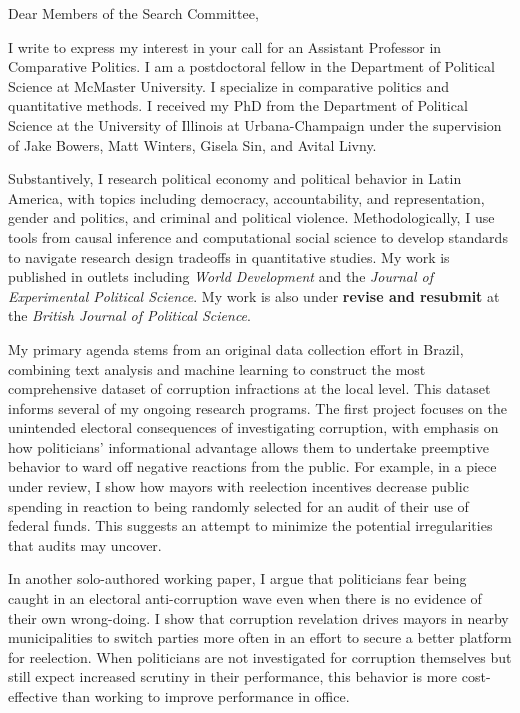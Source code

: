 \documentclass[
  12pt,
]{letter}
\author{}
\date{November 27, 2023}
\begin{document}
\begin{letter}{}
\opening{Dear Members of the Search Committee,}
\ifdefined\Shaded\renewenvironment{Shaded}{\begin{tcolorbox}[boxrule=0pt, interior hidden, borderline west={3pt}{0pt}{shadecolor}, breakable, sharp corners, enhanced, frame hidden]}{\end{tcolorbox}}\fi

I write to express my interest in your call for an Assistant Professor
in Comparative Politics. I am a postdoctoral fellow in the Department of
Political Science at McMaster University. I specialize in comparative
politics and quantitative methods. I received my PhD from the Department
of Political Science at the University of Illinois at Urbana-Champaign
under the supervision of Jake Bowers, Matt Winters, Gisela Sin, and
Avital Livny.

Substantively, I research political economy and political behavior in
Latin America, with topics including democracy, accountability, and
representation, gender and politics, and criminal and political
violence. Methodologically, I use tools from causal inference and
computational social science to develop standards to navigate research
design tradeoffs in quantitative studies. My work is published in
outlets including \emph{World Development} and the \emph{Journal of
Experimental Political Science}. My work is also under \textbf{revise
and resubmit} at the \emph{British Journal of Political Science}.

My primary agenda stems from an original data collection effort in
Brazil, combining text analysis and machine learning to construct the
most comprehensive dataset of corruption infractions at the local level.
This dataset informs several of my ongoing research programs. The first
project focuses on the unintended electoral consequences of
investigating corruption, with emphasis on how politicians'
informational advantage allows them to undertake preemptive behavior to
ward off negative reactions from the public. For example, in a piece
under review, I show how mayors with reelection incentives decrease
public spending in reaction to being randomly selected for an audit of
their use of federal funds. This suggests an attempt to minimize the
potential irregularities that audits may uncover.

In another solo-authored working paper, I argue that politicians fear
being caught in an electoral anti-corruption wave even when there is no
evidence of their own wrong-doing. I show that corruption revelation
drives mayors in nearby municipalities to switch parties more often in
an effort to secure a better platform for reelection. When politicians
are not investigated for corruption themselves but still expect
increased scrutiny in their performance, this behavior is more
cost-effective than working to improve performance in office.


\end{letter}
\end{document}
